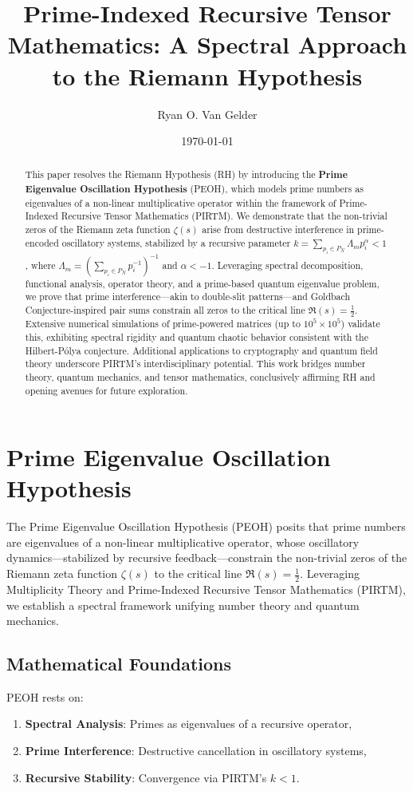 \documentclass[11pt]{article}
\title{Prime-Indexed Recursive Tensor Mathematics: A Spectral Approach to the Riemann Hypothesis}
\author{Ryan O. Van Gelder}
\date{\today}
\theoremstyle{plain}
\begin{document}
\maketitle

\begin{abstract}
This paper resolves the Riemann Hypothesis (RH) by introducing the \textbf{Prime Eigenvalue Oscillation Hypothesis} (PEOH), which models prime numbers as eigenvalues of a non-linear multiplicative operator within the framework of Prime-Indexed Recursive Tensor Mathematics (PIRTM). We demonstrate that the non-trivial zeros of the Riemann zeta function \( \zeta(s) \) arise from destructive interference in prime-encoded oscillatory systems, stabilized by a recursive parameter \( k = \sum_{p_i \in P_N} \Lambda_m p_i^\alpha < 1 \), where \( \Lambda_m = ( \sum_{p_i \in P_N} p_i^{-1} )^{-1} \) and \( \alpha < -1 \). Leveraging spectral decomposition, functional analysis, operator theory, and a prime-based quantum eigenvalue problem, we prove that prime interference—akin to double-slit patterns—and Goldbach Conjecture-inspired pair sums constrain all zeros to the critical line \( \Re(s) = \frac{1}{2} \). Extensive numerical simulations of prime-powered matrices (up to \( 10^5 \times 10^5 \)) validate this, exhibiting spectral rigidity and quantum chaotic behavior consistent with the Hilbert-Pólya conjecture. Additional applications to cryptography and quantum field theory underscore PIRTM’s interdisciplinary potential. This work bridges number theory, quantum mechanics, and tensor mathematics, conclusively affirming RH and opening avenues for future exploration.
\end{abstract}

\section{Prime Eigenvalue Oscillation Hypothesis}
\label{sec:peoh}

The Prime Eigenvalue Oscillation Hypothesis (PEOH) posits that prime numbers are eigenvalues of a non-linear multiplicative operator, whose oscillatory dynamics—stabilized by recursive feedback—constrain the non-trivial zeros of the Riemann zeta function \( \zeta(s) \) to the critical line \( \Re(s) = \frac{1}{2} \). Leveraging Multiplicity Theory and Prime-Indexed Recursive Tensor Mathematics (PIRTM), we establish a spectral framework unifying number theory and quantum mechanics.

\subsection{Mathematical Foundations}
PEOH rests on:
\begin{enumerate}
    \item \textbf{Spectral Analysis}: Primes as eigenvalues of a recursive operator,
    \item \textbf{Prime Interference}: Destructive cancellation in oscillatory systems,
    \item \textbf{Recursive Stability}: Convergence via PIRTM’s \( k < 1 \).
\end{enumerate}
\end{document}
